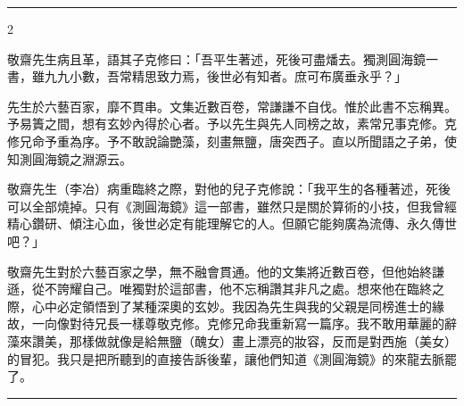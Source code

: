 \documentclass[11pt,a4paper]{article}
\newcommand{\longline}{\noindent\rule{\textwidth}{0.4pt}}
\begin{document}
\vspace{0.3cm}
\longline

\begin{paracol}{2}

敬齋先生病且革，語其子克修曰：「吾平生著述，死後可盡燔去。獨測圓海鏡一書，雖九九小數，吾常精思致力焉，後世必有知者。庶可布廣垂永乎？」

\vspace{0.3cm}

先生於六藝百家，靡不貫串。文集近數百卷，常謙謙不自伐。惟於此書不忘稱異。予易簀之間，想有玄妙內得於心者。予以先生與先人同榜之故，素常兄事克修。克修兄命予重為序。予不敢說論艷藻，刻畫無鹽，唐突西子。直以所聞語之子弟，使知測圓海鏡之淵源云。

\switchcolumn

敬齋先生（李冶）病重臨終之際，對他的兒子克修說：「我平生的各種著述，死後可以全部燒掉。只有《測圓海鏡》這一部書，雖然只是關於算術的小技，但我曾經精心鑽研、傾注心血，後世必定有能理解它的人。但願它能夠廣為流傳、永久傳世吧？」

\vspace{0.3cm}

敬齋先生對於六藝百家之學，無不融會貫通。他的文集將近數百卷，但他始終謙遜，從不誇耀自己。唯獨對於這部書，他不忘稱讚其非凡之處。想來他在臨終之際，心中必定領悟到了某種深奧的玄妙。我因為先生與我的父親是同榜進士的緣故，一向像對待兄長一樣尊敬克修。克修兄命我重新寫一篇序。我不敢用華麗的辭藻來讚美，那樣做就像是給無鹽（醜女）畫上漂亮的妝容，反而是對西施（美女）的冒犯。我只是把所聽到的直接告訴後輩，讓他們知道《測圓海鏡》的來龍去脈罷了。

\end{paracol}

\vspace{1cm}
\longline

\vfill

\begin{center}
\end{center}
\end{document}

